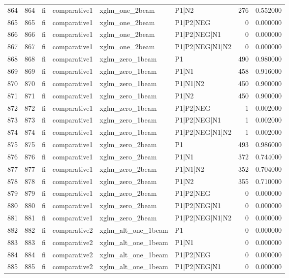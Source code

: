 \begin{tabular}{lrllllrr}
864 & 864 & fi & comparative1 & xglm_one_2beam & P1|N2 & 276 & 0.552000 \\
865 & 865 & fi & comparative1 & xglm_one_2beam & P1|P2|NEG & 0 & 0.000000 \\
866 & 866 & fi & comparative1 & xglm_one_2beam & P1|P2|NEG|N1 & 0 & 0.000000 \\
867 & 867 & fi & comparative1 & xglm_one_2beam & P1|P2|NEG|N1|N2 & 0 & 0.000000 \\
868 & 868 & fi & comparative1 & xglm_zero_1beam & P1 & 490 & 0.980000 \\
869 & 869 & fi & comparative1 & xglm_zero_1beam & P1|N1 & 458 & 0.916000 \\
870 & 870 & fi & comparative1 & xglm_zero_1beam & P1|N1|N2 & 450 & 0.900000 \\
871 & 871 & fi & comparative1 & xglm_zero_1beam & P1|N2 & 450 & 0.900000 \\
872 & 872 & fi & comparative1 & xglm_zero_1beam & P1|P2|NEG & 1 & 0.002000 \\
873 & 873 & fi & comparative1 & xglm_zero_1beam & P1|P2|NEG|N1 & 1 & 0.002000 \\
874 & 874 & fi & comparative1 & xglm_zero_1beam & P1|P2|NEG|N1|N2 & 1 & 0.002000 \\
875 & 875 & fi & comparative1 & xglm_zero_2beam & P1 & 493 & 0.986000 \\
876 & 876 & fi & comparative1 & xglm_zero_2beam & P1|N1 & 372 & 0.744000 \\
877 & 877 & fi & comparative1 & xglm_zero_2beam & P1|N1|N2 & 352 & 0.704000 \\
878 & 878 & fi & comparative1 & xglm_zero_2beam & P1|N2 & 355 & 0.710000 \\
879 & 879 & fi & comparative1 & xglm_zero_2beam & P1|P2|NEG & 0 & 0.000000 \\
880 & 880 & fi & comparative1 & xglm_zero_2beam & P1|P2|NEG|N1 & 0 & 0.000000 \\
881 & 881 & fi & comparative1 & xglm_zero_2beam & P1|P2|NEG|N1|N2 & 0 & 0.000000 \\
882 & 882 & fi & comparative2 & xglm_alt_one_1beam & P1 & 0 & 0.000000 \\
883 & 883 & fi & comparative2 & xglm_alt_one_1beam & P1|N1 & 0 & 0.000000 \\
884 & 884 & fi & comparative2 & xglm_alt_one_1beam & P1|P2|NEG & 0 & 0.000000 \\
885 & 885 & fi & comparative2 & xglm_alt_one_1beam & P1|P2|NEG|N1 & 0 & 0.000000 \\

\end{tabular}
